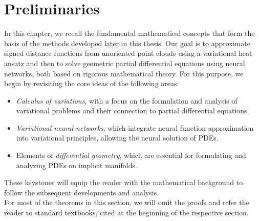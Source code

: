 \documentclass[12pt,openany]{book}
\theoremstyle{plainnormal}
\theoremstyle{remark}
\begin{document}
\newpage
{}
\chapter{Preliminaries}\label{ch:prelim}
In this chapter, we recall the fundamental mathematical concepts that form the basis of the methods developed later in this thesis. Our goal is to approximate signed distance functions from unoriented point clouds using a variational heat ansatz and then to solve geometric partial differential equations using neural networks, both based on rigorous mathematical theory. For this purpose, we begin by revisiting the core ideas of the following areas:
\begin{itemize}
    \item \emph{Calculus of variations}, with a focus on the formulation and analysis of variational problems and their connection to partial differential equations.
    
    \item \emph{Variational neural networks}, which integrate neural function approximation into variational principles, allowing the neural solution of PDEs.
    
    \item Elements of \emph{differential geometry}, which are essential for formulating and analyzing PDEs on implicit manifolds.
\end{itemize}
These keystones will equip the reader with the mathematical background to follow the subsequent developments and analysis.\\
For most of the theorems in this section, we will omit the proofs and refer the reader to standard textbooks, cited at the beginning of the respective section.
\end{document}
